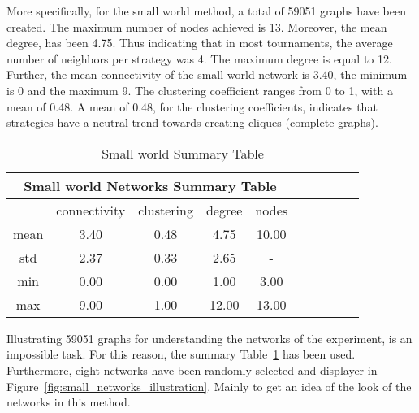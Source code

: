 More specifically, for the small world method, a total of 59051 graphs have
been created. The maximum number of nodes achieved is 13. Moreover, the
mean degree, has been 4.75. Thus indicating that
in most tournaments, the average number of neighbors per strategy was 4.
The maximum degree is equal to 12. Further,
the mean connectivity of the small world network is 3.40, the minimum is 0 and the maximum 9.
The clustering coefficient ranges from 0 to 1, with a mean of 0.48. A mean
of 0.48, for the clustering coefficients, indicates that strategies have a
neutral trend towards creating cliques (complete graphs).

\begin{table}[!hbtp]
	\centering
	\begin{adjustbox}{width=0.5\textwidth}
		\small
		\begin{tabular}{cccccccccc}
				\toprule
			\multicolumn{5}{|c|}{Small world Networks Summary Table}           \\ \hline
			     & connectivity & clustering & degree & nodes                  \\ \hline
			mean & 3.40         & 0.48       & 4.75   & 10.00                  \\ \hline
			std  & 2.37         & 0.33       & 2.65   & \multicolumn{1}{c}{-} \\ \hline
			min  & 0.00         & 0.00       & 1.00   & 3.00                   \\ \hline
			max  & 9.00         & 1.00       & 12.00  & 13.00                   \\ \bottomrule
		\end{tabular}
	\end{adjustbox}
	\caption{Small world Summary Table}
	\label{table:small-world-summary-table}
\end{table}

Illustrating 59051 graphs for understanding the networks of the experiment, is
an impossible task. For this reason, the summary Table~\ref{table:small-world-summary-table}
has been used. Furthermore, eight networks have been randomly selected and
displayer in Figure~\ref{fig:small_networks_illustration}. Mainly to get an idea
of the look of the networks in this method.

